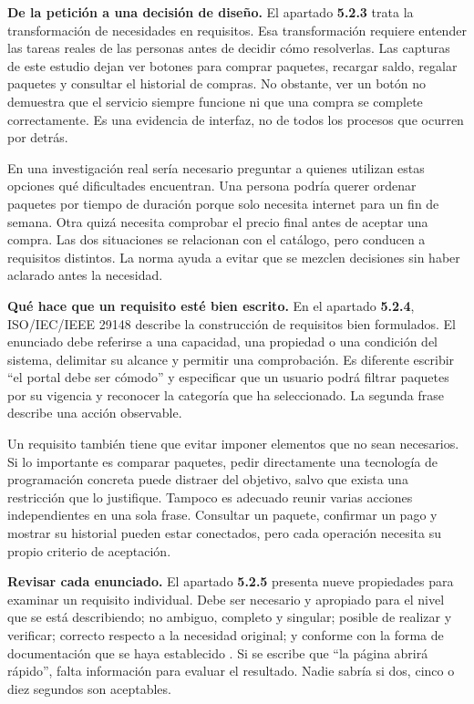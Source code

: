 \documentclass[12pt,a4paper]{article}
\begin{document}
\textbf{De la petición a una decisión de diseño.} El apartado \textbf{5.2.3} trata la transformación de necesidades en requisitos. Esa transformación requiere entender las tareas reales de las personas antes de decidir cómo resolverlas. Las capturas de este estudio dejan ver botones para comprar paquetes, recargar saldo, regalar paquetes y consultar el historial de compras. No obstante, ver un botón no demuestra que el servicio siempre funcione ni que una compra se complete correctamente. Es una evidencia de interfaz, no de todos los procesos que ocurren por detrás.

En una investigación real sería necesario preguntar a quienes utilizan estas opciones qué dificultades encuentran. Una persona podría querer ordenar paquetes por tiempo de duración porque solo necesita internet para un fin de semana. Otra quizá necesita comprobar el precio final antes de aceptar una compra. Las dos situaciones se relacionan con el catálogo, pero conducen a requisitos distintos. La norma ayuda a evitar que se mezclen decisiones sin haber aclarado antes la necesidad.

\textbf{Qué hace que un requisito esté bien escrito.} En el apartado \textbf{5.2.4}, ISO/IEC/IEEE 29148 describe la construcción de requisitos bien formulados. El enunciado debe referirse a una capacidad, una propiedad o una condición del sistema, delimitar su alcance y permitir una comprobación. Es diferente escribir ``el portal debe ser cómodo'' y especificar que un usuario podrá filtrar paquetes por su vigencia y reconocer la categoría que ha seleccionado. La segunda frase describe una acción observable.

Un requisito también tiene que evitar imponer elementos que no sean necesarios. Si lo importante es comparar paquetes, pedir directamente una tecnología de programación concreta puede distraer del objetivo, salvo que exista una restricción que lo justifique. Tampoco es adecuado reunir varias acciones independientes en una sola frase. Consultar un paquete, confirmar un pago y mostrar su historial pueden estar conectados, pero cada operación necesita su propio criterio de aceptación.

\textbf{Revisar cada enunciado.} El apartado \textbf{5.2.5} presenta nueve propiedades para examinar un requisito individual. Debe ser necesario y apropiado para el nivel que se está describiendo; no ambiguo, completo y singular; posible de realizar y verificar; correcto respecto a la necesidad original; y conforme con la forma de documentación que se haya establecido \cite{ieee29148}. Si se escribe que ``la página abrirá rápido'', falta información para evaluar el resultado. Nadie sabría si dos, cinco o diez segundos son aceptables.
\end{document}
